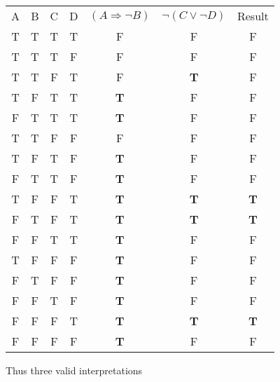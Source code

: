 \begin{enumerate}
\begin{enumerate}
\begin{framed}
    				\begin{tabular}{c|c|c|c|c|c|c}
    					A	&B	&C	&D	&$(A \Rightarrow \lnot B)$	&$\lnot(C \vee \lnot D)$ &Result\\
    					T	&T	&T	&T	&F			&F			&F\\
    					T	&T	&T	&F	&F			&F			&F\\
    					T	&T	&F	&T	&F			&\textbf{T}	&F\\
    					T	&F	&T	&T	&\textbf{T}	&F			&F\\
    					F	&T	&T	&T	&\textbf{T}	&F			&F\\
    					T	&T	&F	&F	&F			&F			&F\\
    					T	&F	&T	&F	&\textbf{T}	&F			&F\\
    					F	&T	&T	&F	&\textbf{T}	&F			&F\\
    					T	&F	&F	&T	&\textbf{T}	&\textbf{T}	&\textbf{T}\\
    					F	&T	&F	&T	&\textbf{T}	&\textbf{T}	&\textbf{T}\\
    					F	&F	&T	&T	&\textbf{T}	&F			&F\\
    					T	&F	&F	&F	&\textbf{T}	&F			&F\\
    					F	&T	&F	&F	&\textbf{T}	&F			&F\\
    					F	&F	&T	&F	&\textbf{T}	&F			&F\\
    					F	&F	&F	&T	&\textbf{T}	&\textbf{T}	&\textbf{T}\\
    					F	&F	&F	&F	&\textbf{T}	&F			&F\\
    				\end{tabular}
    				\FloatBarrier
    				\vspace{5mm}
    				Thus three valid interpretations
    			\end{framed}
    	\end{enumerate}
    	

\end{enumerate}
